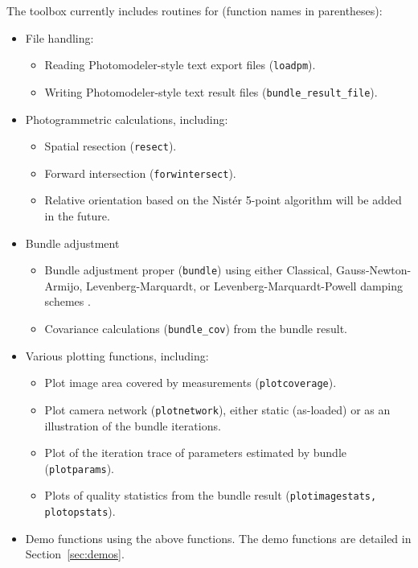 \documentclass{article}
\begin{document}
The toolbox currently includes routines for (function names in parentheses):
\begin{itemize}
\item File handling:
  \begin{itemize}
  \item Reading Photomodeler-style text export files (\texttt{loadpm}).
  \item Writing Photomodeler-style text result files
    (\texttt{bundle\_result\_file}).
  \end{itemize}
\item Photogrammetric calculations, including:
  \begin{itemize}
  \item Spatial resection (\texttt{resect}).
  \item Forward intersection (\texttt{forwintersect}).
  \item Relative orientation based on the Nist{\'e}r 5-point algorithm
    \citep{Stewenius2006:Recent} will be added in the future.
  \end{itemize}
\item Bundle adjustment
  \begin{itemize}
  \item Bundle adjustment proper (\texttt{bundle}) using either
    Classical, Gauss-Newton-Armijo, Levenberg-Marquardt, or
    Levenberg-Marquardt-Powell damping schemes
    \citep{Borlin2013:Bundle}.
  \item Covariance calculations (\texttt{bundle\_cov}) from the bundle
    result.
  \end{itemize}
\item Various plotting functions, including:
  \begin{itemize}
  \item Plot image area covered by measurements
    (\texttt{plotcoverage}).
  \item Plot camera network (\texttt{plotnetwork}), either static
    (as-loaded) or as an illustration of the bundle iterations.
  \item Plot of the iteration trace of parameters estimated by bundle
    (\texttt{plotparams}).
  \item Plots of quality statistics from the bundle result
    (\texttt{plotimagestats, plotopstats}).
  \end{itemize}
\item Demo functions using the above functions. The demo functions are
  detailed in Section~\ref{sec:demos}.
\end{itemize}
\end{document}
